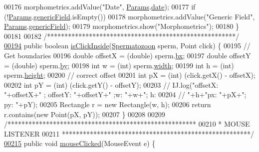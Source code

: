 \begin{DoxyCode}
00176       morphometrics.addValue(\textcolor{stringliteral}{"Date"}, \hyperlink{classdata_1_1_params}{Params}.\hyperlink{classdata_1_1_params_aecbab8174a6d72649883508cf9940d58}{date});
00177     \textcolor{keywordflow}{if} (!\hyperlink{classdata_1_1_params}{Params}.\hyperlink{classdata_1_1_params_a253e4e926c0399ed1ae42b5a5989824d}{genericField}.isEmpty())
00178       morphometrics.addValue(\textcolor{stringliteral}{"Generic Field"}, \hyperlink{classdata_1_1_params}{Params}.\hyperlink{classdata_1_1_params_a253e4e926c0399ed1ae42b5a5989824d}{genericField});
00179     morphometrics.show(\textcolor{stringliteral}{"Morphometrics"});
00180   \}
00181 
00182   \textcolor{comment}{/******************************************************/}
\hypertarget{_morph_window_8java_source_l00194}{}\hyperlink{classgui_1_1_morph_window_aab859aa1fe697dc9361ea47ccc6a80a5}{00194}   \textcolor{keyword}{public} \textcolor{keywordtype}{boolean} \hyperlink{classgui_1_1_morph_window_aab859aa1fe697dc9361ea47ccc6a80a5}{isClickInside}(\hyperlink{classdata_1_1_spermatozoon}{Spermatozoon} sperm, Point click) \{
00195     \textcolor{comment}{// Get boundaries}
00196     \textcolor{keywordtype}{double} offsetX = (double) sperm.\hyperlink{classdata_1_1_spermatozoon_a5c25ae7634a79d11d6679b6b07c240a1}{bx};
00197     \textcolor{keywordtype}{double} offsetY = (\textcolor{keywordtype}{double}) sperm.\hyperlink{classdata_1_1_spermatozoon_affce45e955f0a114a5569e019b8d8634}{by};
00198     \textcolor{keywordtype}{int} w = (int) sperm.\hyperlink{classdata_1_1_spermatozoon_ae426f00e82704fa09578f5446e22d915}{width};
00199     \textcolor{keywordtype}{int} h = (\textcolor{keywordtype}{int}) sperm.\hyperlink{classdata_1_1_spermatozoon_a48083b65ac9a863566dc3e3fff09a5b4}{height};
00200     \textcolor{comment}{// correct offset}
00201     \textcolor{keywordtype}{int} pX = (int) (click.getX() - offsetX);
00202     \textcolor{keywordtype}{int} pY = (int) (click.getY() - offsetY);
00203     \textcolor{comment}{// IJ.log("offsetX: "+offsetX+" ; offsetY: "+offsetY+" ;w: "+w+"; h:}
00204     \textcolor{comment}{// "+h+"px: "+pX+"; py: "+pY);}
00205     Rectangle r = \textcolor{keyword}{new} Rectangle(w, h);
00206     \textcolor{keywordflow}{return} r.contains(\textcolor{keyword}{new} Point(pX, pY));
00207   \}
00208 
00209   \textcolor{comment}{/******************************************************}
00210 \textcolor{comment}{   * MOUSE LISTENER}
00211 \textcolor{comment}{   ******************************************************/}
\hypertarget{_morph_window_8java_source_l00215}{}\hyperlink{classgui_1_1_morph_window_a45d56bd84238e8b56589dfc732e2b2cf}{00215}   \textcolor{keyword}{public} \textcolor{keywordtype}{void} \hyperlink{classgui_1_1_morph_window_a45d56bd84238e8b56589dfc732e2b2cf}{mouseClicked}(MouseEvent e) \{

\end{DoxyCode}
